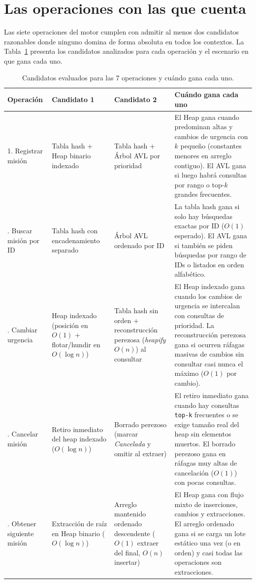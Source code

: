 \documentclass[11pt,a4paper]{article}
\begin{document}
\section{Las operaciones con las que cuenta}

Las siete operaciones del motor cumplen con admitir al menos dos candidatos razonables donde ninguno domina de forma absoluta en todos los contextos. La Tabla~\ref{tab:candidatos} presenta los candidatos analizados para cada operación y el escenario en que gana cada uno.

\begin{table}[htbp]
\centering
\caption{Candidatos evaluados para las 7 operaciones y cuándo gana cada uno.}
\label{tab:candidatos}
\small
\begin{tabular}{p{2.6cm} p{3.1cm} p{3.1cm} p{5.2cm}}
\toprule
\textbf{Operación} & \textbf{Candidato 1} & \textbf{Candidato 2} & \textbf{Cuándo gana cada uno} \\
\midrule
1. Registrar misión & Tabla hash + Heap binario indexado & Tabla hash + Árbol AVL por prioridad & El Heap gana cuando predominan altas y cambios de urgencia con $k$ pequeño (constantes menores en arreglo contiguo). El AVL gana si luego habrá consultas por rango o top-$k$ grandes frecuentes. \\
\addlinespace
2. Buscar misión por ID & Tabla hash con encadenamiento separado & Árbol AVL ordenado por ID & La tabla hash gana si solo hay búsquedas exactas por ID ($O(1)$ esperado). El AVL gana si también se piden búsquedas por rango de IDs o listados en orden alfabético. \\
\addlinespace
3. Cambiar urgencia & Heap indexado (posición en $O(1)$ + flotar/hundir en $O(\log n)$) & Tabla hash sin orden + reconstrucción perezosa (\textit{heapify} $O(n)$) al consultar & El Heap indexado gana cuando los cambios de urgencia se intercalan con consultas de prioridad. La reconstrucción perezosa gana si ocurren ráfagas masivas de cambios sin consultar casi nunca el máximo ($O(1)$ por cambio). \\
\addlinespace
4. Cancelar misión & Retiro inmediato del heap indexado ($O(\log n)$) & Borrado perezoso (marcar \textit{Cancelada} y omitir al extraer) & El retiro inmediato gana cuando hay consultas \texttt{top-k} frecuentes o se exige tamaño real del heap sin elementos muertos. El borrado perezoso gana en ráfagas muy altas de cancelación ($O(1)$) con pocas consultas. \\
\addlinespace
5. Obtener siguiente misión & Extracción de raíz en Heap binario ($O(\log n)$) & Arreglo mantenido ordenado descendente ($O(1)$ extraer del final, $O(n)$ insertar) & El Heap gana con flujo mixto de inserciones, cambios y extracciones. El arreglo ordenado gana si se carga un lote estático una vez (o en orden) y casi todas las operaciones son extracciones. \\

\end{tabular}
\end{table}
\end{document}
